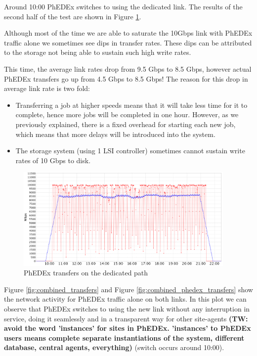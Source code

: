 Around 10:00 PhEDEx switches to using the dedicated link. The results of the 
second half of the test are shown in Figure \ref{fig:solo_transfers}.

Although most of the time we are able to saturate the 10Gbps link with PhEDEx 
traffic alone we sometimes see dips in transfer rates. These dips can be attributed 
to the storage not being able to sustain such high write rates.

This time, the average link rates drop from 9.5 Gbps to 8.5 Gbps, however 
actual PhEDEx transfers go up from 4.5 Gbps to 8.5 Gbps! The reason for this 
drop in average link rate is two fold: 

\begin{itemize}
  \item Transferring a job at higher speeds means that it will take less time for
  it to complete, hence more jobs will be completed in one hour. However, as
  we previously explained, there is a fixed overhead for starting each new job, which
  means that more delays will be introduced into the system.
  \item The storage system (using 1 LSI controller) sometimes cannot sustain
  write rates of 10 Gbps to disk.
\end{itemize}


\begin{figure}[h]
  \centering
  \includegraphics[width=0.95\textwidth]{Figures/FileDownload_Solo_path.png}
  \caption{PhEDEx transfers on the dedicated path}
    \label{fig:solo_transfers}
\end{figure} 

Figure \ref{fig:combined_transfers} and Figure \ref{fig:combined_phedex_transfers} show
the  network activity for PhEDEx traffic alone on both links. 
In this plot we can observe that PhEDEx switches to using the
new link without any interruption in service, doing it seamlessly and in a 
transparent way for other site-agents \textbf{(TW: avoid the word 'instances' for sites in PhEDEx. 'instances' to PhEDEx users means complete separate instantiations of the system, different database, central agents, everything)} (switch occurs around 10:00).

